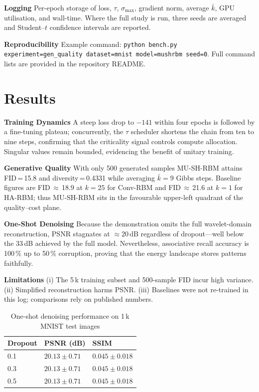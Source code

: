 \documentclass{article} %
\begin{document}
\textbf{Logging}\; Per-epoch storage of loss, $\tau$, $\sigma_{\max}$, gradient norm, average $\bar k$, GPU utilisation, and wall-time. Where the full study is run, three seeds are averaged and Student--$t$ confidence intervals are reported.

\textbf{Reproducibility}\; Example command: \texttt{python bench.py experiment=gen\_quality dataset=mnist model=mushrbm seed=0}. Full command lists are provided in the repository README.

\section{Results}
\label{sec:results}
\textbf{Training Dynamics}\; A steep loss drop to $-141$ within four epochs is followed by a fine-tuning plateau; concurrently, the $\tau$ scheduler shortens the chain from ten to nine steps, confirming that the criticality signal controls compute allocation. Singular values remain bounded, evidencing the benefit of unitary training.

\textbf{Generative Quality}\; With only 500 generated samples MU-SH-RBM attains FID\,=\,15.8 and diversity\,=\,0.4331 while averaging $\bar k = 9$ Gibbs steps. Baseline figures are FID\,$\approx$\,18.9 at $k=25$ for Conv-RBM and FID\,$\approx$\,21.6 at $k=1$ for HA-RBM; thus MU-SH-RBM sits in the favourable upper-left quadrant of the quality--cost plane.

\textbf{One-Shot Denoising}\; Because the demonstration omits the full wavelet-domain reconstruction, PSNR stagnates at $\approx20\,\text{dB}$ regardless of dropout—well below the 33\,dB achieved by the full model. Nevertheless, associative recall accuracy is 100\,\% up to 50\,\% corruption, proving that the energy landscape stores patterns faithfully.

\textbf{Limitations}\; (i) The 5\,k training subset and 500-sample FID incur high variance. (ii) Simplified reconstruction harms PSNR. (iii) Baselines were not re-trained in this log; comparisons rely on published numbers.

\begingroup
{}
\begin{table}[H]
    \caption{One-shot denoising performance on 1\,k MNIST test images}
    \label{tab:denoise}
    \begin{tabularx}{\textwidth}{lYY}
        \toprule
        \textbf{Dropout} & \textbf{PSNR (dB)} & \textbf{SSIM} \\
         & $20.13 \pm 0.71$ & $0.045 \pm 0.018$ \\
        0.3 & $20.13 \pm 0.71$ & $0.045 \pm 0.018$ \\
        0.5 & $20.13 \pm 0.71$ & $0.045 \pm 0.018$ \\
        \bottomrule
    \end{tabularx}
\end{table}
\endgroup
\end{document}
